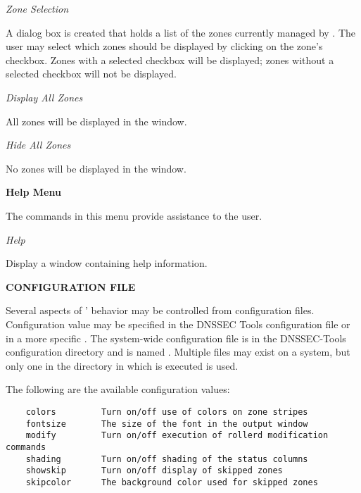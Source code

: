 \begin{description}

\item {\it Zone Selection}

A dialog box is created that holds a list of the zones currently managed by
.  The user may select which zones should be displayed by clicking
on the zone's checkbox.  Zones with a selected checkbox will be displayed;
zones without a selected checkbox will not be displayed.

\item {\it Display All Zones}

All zones will be displayed in the  window.

\item {\it Hide All Zones}

No zones will be displayed in the  window.

\end{description}

{\bf Help Menu}

The commands in this menu provide assistance to the user.

\begin{description}

\item {\it Help}

Display a window containing help information.

\end{description}

{\bf CONFIGURATION FILE}

Several aspects of ' behavior may be controlled from
configuration files.  Configuration value may be specified in the DNSSEC Tools
configuration file or in a more specific .  The
system-wide  configuration file is in the DNSSEC-Tools
configuration directory and is named .  Multiple
 files may exist on a system, but only one in the
directory in which  is executed is used.

The following are the available configuration values:

\begin{verbatim}
    colors         Turn on/off use of colors on zone stripes
    fontsize       The size of the font in the output window
    modify         Turn on/off execution of rollerd modification commands
    shading        Turn on/off shading of the status columns
    showskip       Turn on/off display of skipped zones
    skipcolor      The background color used for skipped zones
\end{verbatim}

